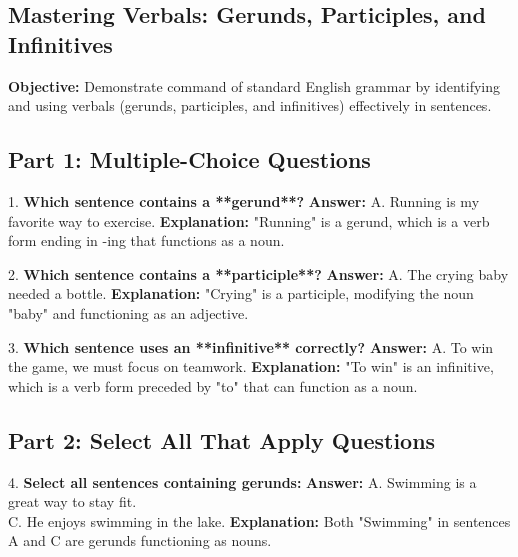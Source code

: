 \documentclass[12pt]{article}
\begin{document}
\subsection*{Mastering Verbals: Gerunds, Participles, and Infinitives}
\onehalfspacing

\begin{tcolorbox}[colframe=black!40, colback=gray!0, title=Learning Objective]
\textbf{Objective:} Demonstrate command of standard English grammar by identifying and using verbals (gerunds, participles, and infinitives) effectively in sentences.
\end{tcolorbox}


\subsection*{Part 1: Multiple-Choice Questions}

1. \textbf{Which sentence contains a **gerund**?}  
\textbf{Answer:} A. Running is my favorite way to exercise.  
\textbf{Explanation:} "Running" is a gerund, which is a verb form ending in -ing that functions as a noun.

\vspace{1cm}
2. \textbf{Which sentence contains a **participle**?}  
\textbf{Answer:} A. The crying baby needed a bottle.  
\textbf{Explanation:} "Crying" is a participle, modifying the noun "baby" and functioning as an adjective.

\vspace{1cm}
3. \textbf{Which sentence uses an **infinitive** correctly?}  
\textbf{Answer:} A. To win the game, we must focus on teamwork.  
\textbf{Explanation:} "To win" is an infinitive, which is a verb form preceded by "to" that can function as a noun.

\subsection*{Part 2: Select All That Apply Questions}

4. \textbf{Select all sentences containing gerunds:}  
\textbf{Answer:} A. Swimming is a great way to stay fit. \\
C. He enjoys swimming in the lake.  
\textbf{Explanation:} Both "Swimming" in sentences A and C are gerunds functioning as nouns.
\end{document}
